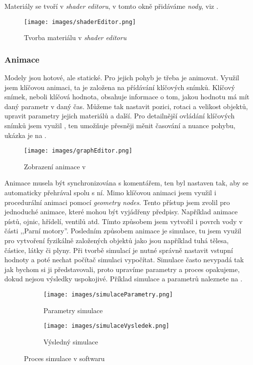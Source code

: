 {{Materiály se tvoří v \textit{shader editoru}, v tomto okně přidáváme \textit{nody}, viz .}

\begin{figure}[H]
    \centering
    \texttt{[image: images/shaderEditor.png]}
    \caption{Tvorba materiálu v \textit{shader editoru} \jaObr}
    \label{obr:shaderEditor}
\end{figure}

\newpage

\subsubsection{Animace}
{Modely jsou hotové, ale statické. Pro jejich pohyb je třeba je animovat. Využil jsem klíčovou animaci, ta je založena na přídávání klíčových snímků. Klíčový snímek, neboli klíčová hodnota, obsahuje informace o tom, jakou hodnotu má mít daný parametr v daný čas. Můžeme tak nastavit pozici, rotaci a velikost objektů, upravit parametry jejich materiálů a další.}\odst
{Pro detailnější ovládání klíčových snímků jsem využil , ten umožňuje přesněji měnit časování a nuance pohybu, ukázka  je na .}

\begin{figure}[H]
    \centering
    \texttt{[image: images/graphEditor.png]}
    \caption{Zobrazení animace v  \jaObr}
    \label{obr:grafEditor}
\end{figure}

{Animace musela být synchronizována s komentářem, ten byl nastaven tak, aby se automaticky přehrával spolu s ní. Mimo klíčovou animaci jsem využil i procedurální animaci pomocí \textit{geometry nodes}. Tento přístup jsem zvolil pro jednoduché animace, které mohou být vyjádřeny předpisy. Například animace pístů, ojnic, hřídelí, ventilů atd. Tímto způsobem jsem vytvořil i povrch vody v části ,,Parní motory''.}\odst
{Posledním způsobem animace je simulace, tu jsem využil pro vytvoření fyzikálně založených objektů jako jsou například tuhá tělesa, částice, látky či plyny. Při tvorbě simulací je nutné správně nastavit vstupní hodnoty a poté nechat počítač simulaci vypočítat. Simulace často nevypadá tak jak bychom si ji představovali, proto upravíme parametry a proces opakujeme, dokud nejsou výsledky uspokojivé. Příklad simulace a parametrů naleznete na .}

\begin{figure}[H]
    \centering
    \begin{subfigure}{0.35\textwidth}
        \centering
        \texttt{[image: images/simulaceParametry.png]}
        \caption{Parametry simulace\\\jaObr}
    \end{subfigure}%
    \begin{subfigure}{0.6\textwidth}
        \centering
        \texttt{[image: images/simulaceVysledek.png]}
        \caption{Výsledný simulace \jaObr}
    \end{subfigure}
    \caption{Proces simulace v softwaru }
    \label{obr:simulace}
\end{figure}

}
